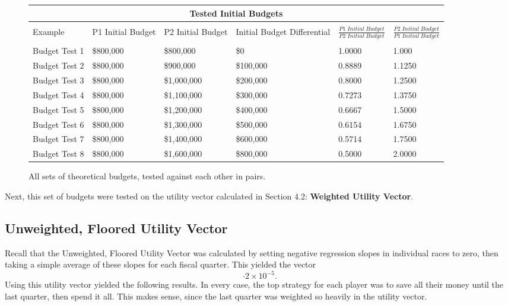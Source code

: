 \documentclass[11pt]{article}
\begin{document}
\begin{figure}
\tiny
\begin{tabular}{ |p{2.0cm}|p{2.0cm} p{2.0cm}|p{3.0cm}|p{2.0cm} p{2.0cm}|}
\hline
\multicolumn{6}{|c|}{Tested Initial Budgets} \\
\hline
&&&&&\\
Example & P1 Initial Budget & P2 Initial Budget & Initial Budget Differential & $\frac{P1\;Initial\;Budget}{P2\;Initial\;Budget}$ & $\frac{P2\;Initial\;Budget}{P1\;Initial\;Budget}$\\
&&&&&\\
\hline
Budget Test 1 & \$800,000 & \$800,000 & \$0 & 1.0000 & 1.000\\
\hline
Budget Test 2 & \$800,000 & \$900,000 & \$100,000 & 0.8889 & 1.1250\\
\hline
Budget Test 3 & \$800,000 & \$1,000,000 & \$200,000 & 0.8000 & 1.2500\\
\hline
Budget Test 4 & \$800,000 & \$1,100,000 & \$300,000 & 0.7273 & 1.3750\\
\hline
Budget Test 5 & \$800,000 & \$1,200,000 & \$400,000 & 0.6667 & 1.5000\\
\hline
Budget Test 6 & \$800,000 & \$1,300,000 & \$500,000 & 0.6154 & 1.6750\\
\hline
Budget Test 7 & \$800,000 & \$1,400,000 & \$600,000 & 0.5714 & 1.7500\\
\hline
Budget Test 8 & \$800,000 & \$1,600,000 & \$800,000 & 0.5000 & 2.0000\\
\hline
\end{tabular}
\caption{All sets of theoretical budgets, tested against each other in pairs.}
\label{initialbudgets}
\end{figure}
Next, this set of budgets were tested on the utility vector calculated in Section 4.2: \textbf{Weighted Utility Vector}.
\subsection{Unweighted, Floored Utility Vector}
Recall that the Unweighted, Floored Utility Vector was calculated by setting
negative regression slopes in individual races to zero, then taking a simple
average of these slopes for each fiscal quarter. This yielded the vector
\begin{equation}
[ 0.611974882, 0.214168992, 0.234584564, 2.111203038 ]\cdot 2\times 10^{-5}.
\end{equation}
 Using this utility vector yielded the
following results. In every case, the top strategy for each player was to save
all their money until the last quarter, then spend it all. This makes sense,
since the last quarter was weighted so heavily in the utility vector.\\
\end{document}

